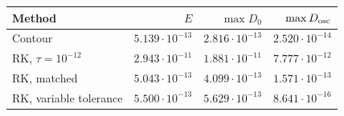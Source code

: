 \begin{tabular}{lrrr}
\toprule
Method & $E$ & $\max D_0$ & $\max D_{\rm osc}$\\
\midrule
Contour & $5.139\cdot10^{-13}$ & $2.816\cdot10^{-13}$ & $2.520\cdot10^{-14}$\\
RK, $\tau=10^{-12}$ & $2.943\cdot10^{-11}$ & $1.881\cdot10^{-11}$ & $7.777\cdot10^{-12}$\\
RK, matched & $5.043\cdot10^{-13}$ & $4.099\cdot10^{-13}$ & $1.571\cdot10^{-13}$\\
RK, variable tolerance & $5.500\cdot10^{-13}$ & $5.629\cdot10^{-13}$ & $8.641\cdot10^{-16}$\\
\bottomrule
\end{tabular}
